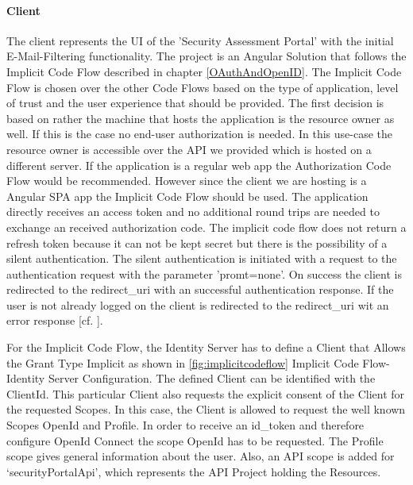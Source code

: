 \paragraph{Client}The client represents the UI of the 'Security Assessment Portal' with the initial E-Mail-Filtering functionality. The project is an Angular Solution that follows the Implicit Code Flow described in chapter \ref{OAuthAndOpenID}. The Implicit Code Flow is chosen over the other Code Flows based on the type of application, level of trust and the user experience that should be provided. The first decision is based on rather the machine that hosts the application is the resource owner as well. If this is the case no end-user authorization is needed. In this use-case the resource owner is accessible over the API we provided which is hosted on a different server. If the application is a regular web app the Authorization Code Flow would be recommended. However since the client we are hosting is a Angular SPA app the Implicit Code Flow should be used. The application directly receives an access token and no additional round trips are needed to exchange an received authorization code. The implicit code flow does not return a refresh token because it can not be kept secret but there is the possibility of a silent authentication. The silent authentication is initiated with a request to the authentication request with the parameter 'promt=none'. On success the client is redirected to the redirect\_uri with an successful authentication response. If the user is not already logged on the client is redirected to the redirect\_uri wit an error response [cf. \cite{OAuth:2018:Flow}].  


For the Implicit Code Flow, the Identity Server has to define a Client that Allows the Grant Type Implicit as shown in \ref{fig:implicitcodeflow} Implicit Code Flow- Identity Server Configuration. The defined Client can be identified with the ClientId. This particular Client also requests the explicit consent of the Client for the requested Scopes. In this case, the Client is allowed to request the well known Scopes OpenId and Profile. In order to receive an id\_token and therefore configure OpenId Connect the scope OpenId has to be requested. The Profile scope gives general information about the user. Also, an API scope is added for ‘securityPortalApi’, which represents the API Project holding the Resources. 

